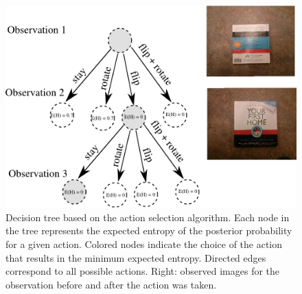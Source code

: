         
    \begin{figure}
    		\includegraphics[width = \columnwidth]{pics/tree_small2.png}
    	\caption{Decision tree based on the action selection algorithm. Each node in the tree represents the expected entropy of the posterior probability for a given action. Colored nodes indicate the choice of the action that results in the minimum expected entropy. Directed edges correspond to all possible actions. Right: observed images for the observation before and after the action was taken. }
    	    	\label{fig:tree}
    \end{figure}
    
